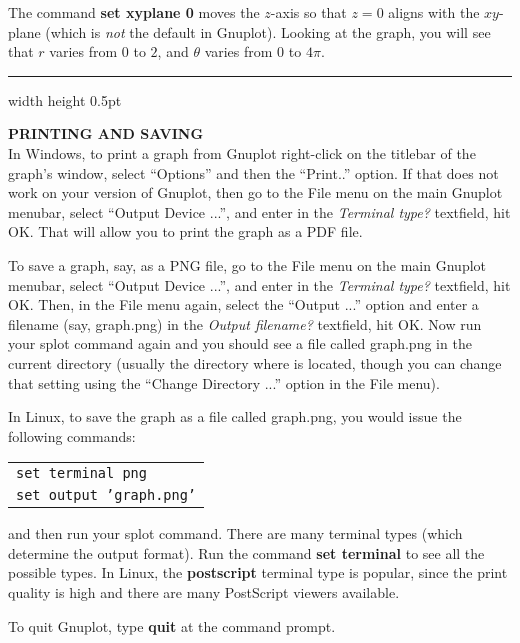 \par\noindent The command \textbf{set xyplane 0} moves the $z$-axis so that $z=0$ aligns with the $xy$-plane (which
is \emph{not} the default in Gnuplot). Looking at the graph, you will see that $r$ varies from $0$ to $2$, and $\theta$
varies from $0$ to $4\pi$.\vspace{2mm}
\hrule width \textwidth height 0.5pt\vspace{1mm}
\vspace{3mm}

\par\noindent\textbf{PRINTING AND SAVING}\vspace{2mm}\\
In Windows, to print a graph from Gnuplot right-click on the titlebar of the graph's window, select ``Options'' and then
the ``Print..'' option. If that does not work on your version of Gnuplot, then go to the File menu on the main Gnuplot menubar,
select ``Output Device ...'', and enter  in the \emph{Terminal type?} textfield, hit OK. That will
allow you to print the graph as a PDF file.

To save a graph, say, as a PNG file, go to the File menu on the main Gnuplot menubar,
select ``Output Device ...'', and enter  in the \emph{Terminal type?} textfield, hit OK. Then, in the
File menu again, select the ``Output ...'' option and enter a filename (say, graph.png) in the \emph{Output
filename?} textfield, hit OK. Now run your splot command again and you should see a file called
graph.png in the current directory (usually the directory where  is located, though you can change
that setting using the ``Change Directory ...'' option in the File menu).\\

\par\noindent In Linux, to save the graph as a file called graph.png, you would issue the following
commands:\vspace{2mm}

\begin{tabular}{l @{}}
\texttt{set terminal png}\\
\texttt{set output 'graph.png'}
\end{tabular}\vspace{2mm}

\par\noindent and then run your splot command. There are many terminal types (which determine the output format). Run
the command \textbf{set terminal} to see all the possible types. In Linux, the \textbf{postscript} terminal type is
popular, since the print quality is high and there are many PostScript viewers available.
\vspace{2mm}

\par\noindent To quit Gnuplot, type \textbf{quit} at the \textbf{} command prompt.

